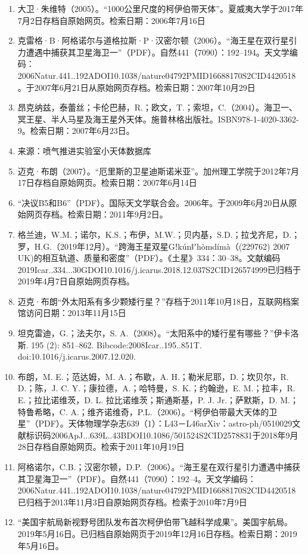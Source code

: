 \begin{enumerate}
\item 大卫·朱维特（2005）。“1000公里尺度的柯伊伯带天体”。夏威夷大学于2017年7月2日存档自原始网页。检索日期：2006年7月16日
\item 克雷格·B·阿格诺尔与道格拉斯·P·汉密尔顿（2006）。“海王星在双行星引力遭遇中捕获其卫星海卫一”（PDF）。自然441（7090）：192–194。天文学编码：2006Natur.441..192ADOI10.1038/nature04792PMID16688170S2CID4420518。于2007年6月21日从原始网页存档。检索日期：2007年10月29日
\item 昂克纳兹，泰蕾丝；卡伦巴赫，R.；欧文，T.；索坦，C.（2004）。海卫一、冥王星、半人马星及海王星外天体。施普林格出版社。ISBN978-1-4020-3362-9。检索日期：2007年6月23日。
\item 来源：喷气推进实验室小天体数据库
\item 迈克·布朗（2007）。“厄里斯的卫星迪斯诺米亚”。加州理工学院于2012年7月17日存档自原始网页。检索日期：2007年6月14日
\item “决议B5和B6”（PDF）。国际天文学联合会。2006年。于2009年6月20日从原始网页存档。检索日期：2011年9月2日。
\item 格兰迪，W.M.；诺尔，K.S.；布伊，M.W.；贝内基，S.D.；拉戈齐尼，D.；罗，H.G.（2019年12月）。“跨海王星双星Gǃkúnǁʼhòmdímà（(229762) 2007 UK)的相互轨道、质量和密度”（PDF）。《土星》334：30–38。文献编码2019Icar..334...30GDOI10.1016/j.icarus.2018.12.037S2CID126574999已归档于2019年4月7日自原始网页存档。
\item 迈克·布朗“外太阳系有多少颗矮行星？”存档于2011年10月18日，互联网档案馆访问日期：2013年11月15日
\item 坦克雷迪，G.；法夫尔，S. A.（2008）。“太阳系中的矮行星有哪些？”伊卡洛斯. 195 (2): 851–862. Bibcode:2008Icar..195..851T. doi:10.1016/j.icarus.2007.12.020.
\item 布朗，M. E.；范达姆，M. A.；布歇，A. H.；勒米尼耶，D.；坎贝尔，R. D.；陈，J. C. Y.；康拉德，A.；哈特曼，S. K.；约翰逊，E. M.；拉丰，R. E.；拉比诺维茨，D. L. 拉比诺维茨；斯通斯基，P. J. Jr.；萨默斯，D. M.；特鲁希略，C. A.；维齐诺维奇，P.L.（2006）。“柯伊伯带最大天体的卫星”（PDF）。天体物理学杂志639（1）：L43－L46arXiv：astro-ph/0510029文献标识码2006ApJ...639L..43BDOI10.1086/501524S2CID2578831于2018年9月28日存档自原始网页。检索于2011年10月19日
\item 阿格诺尔，C.B.；汉密尔顿，D.P.（2006）。“海王星在双行星引力遭遇中捕获其卫星海卫一”（PDF）。自然441（7090）：192–4。天文学编码：2006Natur.441..192ADOI10.1038/nature04792PMID16688170S2CID4420518已归档于2013年11月3日自原始网页存档。检索于2010年7月9日
\item “美国宇航局新视野号团队发布首次柯伊伯带飞越科学成果”。美国宇航局。2019年5月16日。已归档自原始网页于2019年12月16日存档。检索日期：2019年5月16日。

\end{enumerate}
